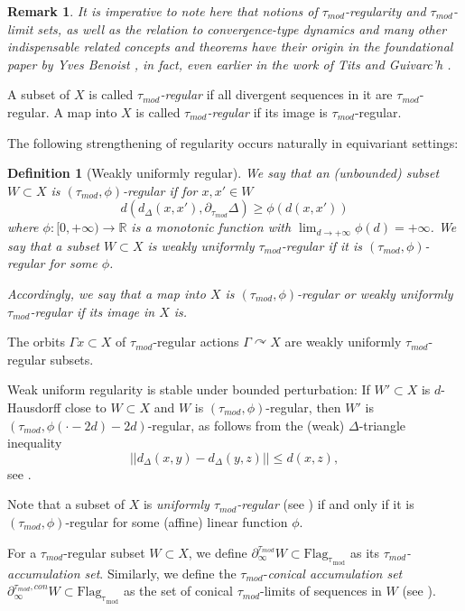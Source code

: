 \documentclass[12pt]{article}
\theoremstyle{boldplain}
\theoremstyle{bolddefinition}
\newtheorem{dfn}[equation]{Definition}
\newtheorem{rem}[equation]{Remark}
\numberwithin{equation}{section}
\def\R{{\mathbb R}}
\def\Ga{\Gamma}
\def\De{\Delta}
\def\acts{\curvearrowright}
\def\Dt{\partial_{\tau_{mod}}}
\def\Flagt{\operatorname{Flag_{\tau_{mod}}}}
\def\geot{\partial_{\infty}^{\tau_{mod}}}
\def\geotc{\partial_{\infty}^{\tau_{mod},con}}
\def\taumod{\tau_{mod}}
\begin{document}
\begin{rem}
It is imperative to note here that 
notions of $\taumod$-regularity and $\taumod$-limit sets, 
as well as the relation to convergence-type dynamics
and many other indispensable related concepts and theorems 
have their origin in the foundational paper by Yves Benoist \cite{Benoist}, 
in fact, 
even earlier in the work of Tits \cite{Tits} and Guivarc'h \cite{Guivarch}. 
\end{rem}




A subset of $X$ is called {\em $\taumod$-regular} 
if all divergent sequences in it are $\taumod$-regular.
A map into $X$ is called {\em $\taumod$-regular} 
if its image is $\taumod$-regular.


The following  strengthening of  regularity occurs naturally in equivariant settings:

\begin{dfn}[Weakly uniformly regular]\label{defn:WUR}
We say that an (unbounded) subset $W\subset X$ is {\em $(\taumod,\phi)$-regular} 
if for $x, x'\in W$ 
$$d(d_{\De}(x,x'),\Dt\De)\geq \phi(d(x,x'))$$
where $\phi:[0,+\infty)\to\R$ is a monotonic function with $\lim_{d\to+\infty}\phi(d)=+\infty$.
We say that a subset $W\subset X$ is {\em weakly uniformly $\taumod$-regular} 
if it is $(\taumod,\phi)$-regular for some $\phi$.

Accordingly, we say that a map into $X$ is {\em $(\taumod,\phi)$-regular} or {\em weakly uniformly $\taumod$-regular} 
if its image in $X$ is.
\end{dfn}

The orbits $\Ga x\subset X$ of $\taumod$-regular actions $\Ga\acts X$ are weakly uniformly $\taumod$-regular subsets. 

Weak uniform regularity is stable under bounded perturbation:
If $W'\subset X$ is $d$-Hausdorff close to $W\subset X$ and $W$ is $(\taumod,\phi)$-regular,
then $W'$ is $(\taumod,\phi(\cdot-2d)-2d)$-regular,
as follows from the (weak) $\De$-triangle inequality
{
$$
||d_\Delta(x,y)- d_\Delta(y,z)||\le d(x,z),
$$
see \cite{KLM}. 
}

Note that 
a subset of $X$ is {\em uniformly $\taumod$-regular} (see \cite[\S 4.6]{anolec}) 
if and only if it is $(\taumod,\phi)$-regular for some (affine) linear function $\phi$. 

\medskip
For a $\taumod$-regular subset $W\subset X$, we define $\geot W\subset\Flagt$ as its {\em $\taumod$-accumulation set}.
Similarly, we define the $\taumod$-{\em conical accumulation set} $\geotc W\subset\Flagt$ 
as the set of conical $\taumod$-limits of sequences in $W$ (see \cite[Def. 5.33]{anolec}).
\end{document}
